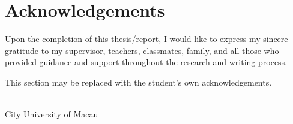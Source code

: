 \chapter*{Acknowledgements}
{}

Upon the completion of this thesis/report, I would like to express my sincere gratitude to my supervisor, teachers, classmates, family, and all those who provided guidance and support throughout the research and writing process.

This section may be replaced with the student's own acknowledgements.

\vspace{2.0cm}

\begin{flushright}
\studentname \\
City University of Macau \\
\submissiondate
\end{flushright}
